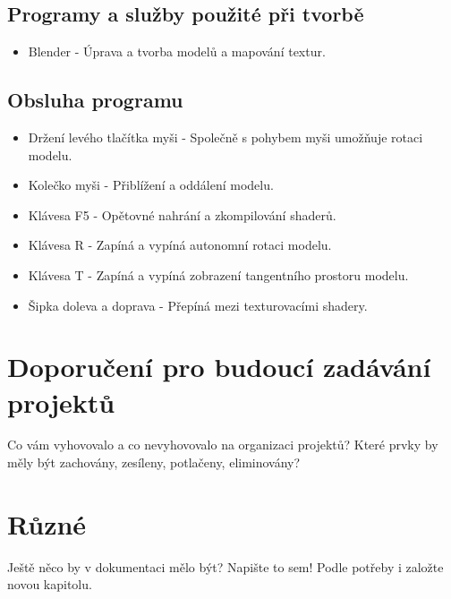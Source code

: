 \documentclass[12pt,a4paper,titlepage,final]{report}
\begin{document}
\section{Programy a služby použité při tvorbě}
\begin{itemize}
	\item Blender - Úprava a tvorba modelů a mapování textur.
\end{itemize}

\section{Obsluha programu}
\begin{itemize}
	\item Držení levého tlačítka myši - Společně s pohybem myši umožňuje rotaci modelu.
	\item Kolečko myši - Přiblížení a oddálení modelu.
	\item Klávesa F5 - Opětovné nahrání a zkompilování shaderů.
	\item Klávesa R - Zapíná a vypíná autonomní rotaci modelu.
	\item Klávesa T - Zapíná a vypíná zobrazení tangentního prostoru modelu.
	\item Šipka doleva a doprava - Přepíná mezi texturovacími shadery.
	
	
\end{itemize}

\chapter{Doporučení pro budoucí zadávání projektů}

Co vám vyhovovalo a co nevyhovovalo na organizaci projektů? Které prvky by měly být zachovány, zesíleny, potlačeny, eliminovány?


\chapter{Různé}

Ještě něco by v dokumentaci mělo být? Napište to sem! Podle potřeby i založte
novou kapitolu.




\nocite{cite1}
\nocite{cite2}
\nocite{cite3}


\end{document}
